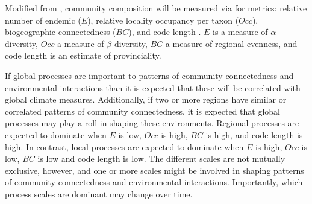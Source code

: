 \documentclass[12pt,letterpaper]{article}
\begin{document}
Modified from \citet{Sidor2013}, community composition will be measured via for metrics: relative number of endemic (\(E\)), relative locality occupancy per taxon (\(Occ\)), biogeographic connectedness (\(BC\)), and code length \citep{Rosvall2008,Rosvall2009a}. \(E\) is a measure of \(\alpha\) diversity, \(Occ\) a measure of \(\beta\) diversity, \(BC\) a measure of regional evenness, and code length is an estimate of provinciality.

If global processes are important to patterns of community connectedness and environmental interactions than it is expected that these will be correlated with global climate measures. Additionally, if two or more regions have similar or correlated patterns of community connectedness, it is expected that global processes may play a roll in shaping these environments. Regional processes are expected to dominate when \(E\) is low, \(Occ\) is high, \(BC\) is high, and code length is high. In contrast, local processes are expected to dominate when \(E\) is high, \(Occ\) is low, \(BC\) is low and code length is low. The different scales are not mutually exclusive, however, and one or more scales might be involved in shaping patterns of community connectedness and environmental interactions. Importantly, which process scales are dominant may change over time.


\clearpage


\end{document}
